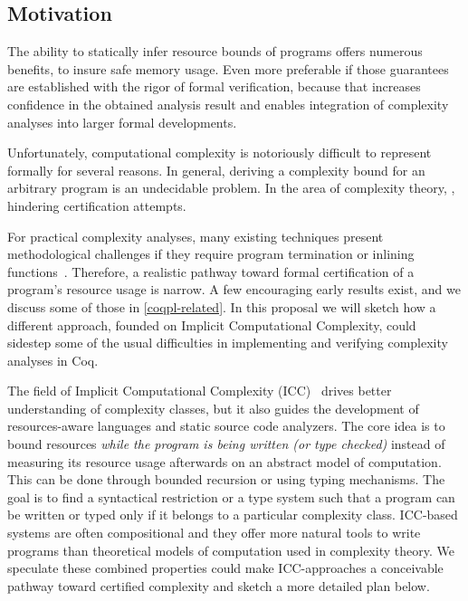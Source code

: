 \subsection{Motivation}

The ability to statically infer resource bounds of programs offers numerous benefits, \eg
to insure safe memory usage.
Even more preferable if those guarantees are established with the rigor of formal verification,
because that increases confidence in the obtained analysis result and enables integration of complexity
analyses into larger formal developments.

Unfortunately, computational complexity is notoriously difficult to represent formally for several reasons.
In general, deriving a complexity bound for an arbitrary program is an undecidable problem. %
In the area of complexity theory, , hindering certification attempts.

For practical complexity analyses, many existing techniques present methodological challenges if they require \eg program termination or inlining functions~\cite{carbonneaux2015}.
Therefore, a realistic pathway toward formal certification of a program's resource usage is narrow.
A few encouraging early results exist, and we discuss some of those in \autoref{coqpl-related}.
In this proposal we will sketch how a different approach, founded on Implicit Computational Complexity,
could sidestep some of the usual difficulties in implementing and verifying complexity analyses in Coq.

The field of Implicit Computational Complexity (ICC)~\cite{dallago2011} drives better understanding of complexity classes, but it
also guides the development of resources-aware languages and static source code analyzers.
The core idea is to bound resources \emph{while the program is being written (or type checked)} instead of measuring its resource usage afterwards on an abstract model of computation.
This can be done through \eg bounded recursion or using typing mechanisms.
The goal is to find a syntactical restriction or a type system such that a program can be written or typed only if it belongs to a particular complexity class.
ICC-based systems are often compositional and they offer more natural tools to write programs than theoretical models of computation used in complexity theory.
We speculate these combined properties could make ICC-approaches a conceivable pathway toward certified complexity and sketch a more detailed plan below.


